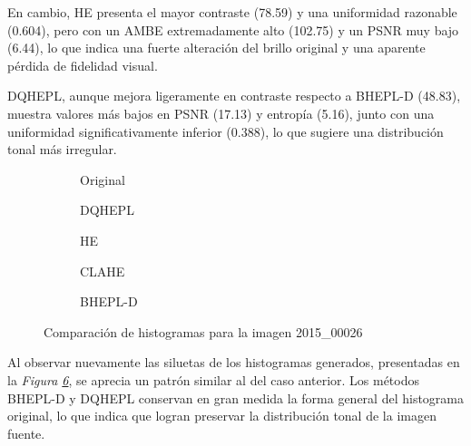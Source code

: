 \documentclass[sigchi]{acmart}
\begin{document}
En cambio, HE presenta el mayor contraste (78.59) y una uniformidad razonable (0.604), pero con
un AMBE extremadamente alto (102.75) y un PSNR muy bajo (6.44), lo que indica una fuerte
alteración del brillo original y una aparente pérdida de fidelidad visual.

DQHEPL, aunque mejora ligeramente en contraste respecto a BHEPL-D (48.83), muestra valores más
bajos en PSNR (17.13) y entropía (5.16), junto con una uniformidad significativamente inferior
(0.388), lo que sugiere una distribución tonal más irregular.

\begin{figure}[htbp]
	\centering
	\begin{subfigure}[b]{0.45\textwidth}
		\resizebox{\linewidth}{!}{}
		\caption{Original}
		\label{fig:original_2}
	\end{subfigure}
	\hfill
	\begin{subfigure}[b]{0.45\textwidth}
		\resizebox{\linewidth}{!}{}
		\caption{DQHEPL}
		\label{fig:dqhepl_2}
	\end{subfigure}

	\begin{subfigure}[b]{0.45\textwidth}
		\resizebox{\linewidth}{!}{}
		\caption{HE}
		\label{fig:he_2}
	\end{subfigure}
	\hfill
	\begin{subfigure}[b]{0.45\textwidth}
		\resizebox{\linewidth}{!}{}
		\caption{CLAHE}
		\label{fig:clahe_2}
	\end{subfigure}

	\centering
	\begin{subfigure}[b]{0.45\textwidth}
		\resizebox{\linewidth}{!}{}
		\caption{BHEPL-D}
		\label{fig:bhepl_2}
	\end{subfigure}

	\caption{Comparación de histogramas para la imagen 2015\_00026}
	\label{fig:histogramas_2}
\end{figure}

Al observar nuevamente las siluetas de los histogramas generados, presentadas en la
\emph{Figura \ref{fig:histogramas_2}}, se aprecia un patrón similar al del caso anterior. Los
métodos BHEPL-D y DQHEPL conservan en gran medida la forma general del histograma original, lo
que indica que logran preservar la distribución tonal de la imagen fuente.
\end{document}
